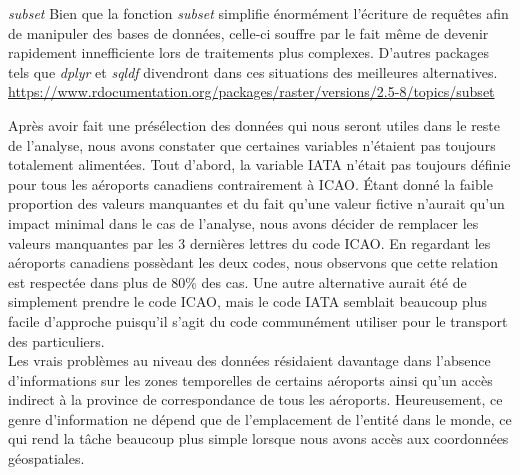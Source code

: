 \begin{moreInfo}{\emph{subset}}
	Bien que la fonction \emph{subset} simplifie énormément l'écriture de requêtes afin de manipuler des bases de données, celle-ci souffre par le fait même de devenir rapidement innefficiente lors de traitements plus complexes. D'autres packages tels que \emph{dplyr} et \emph{sqldf} divendront dans ces situations des meilleures alternatives. \\
	\url{https://www.rdocumentation.org/packages/raster/versions/2.5-8/topics/subset}
\end{moreInfo}

\noindent
Après avoir fait une présélection des données qui nous seront utiles dans le reste de l'analyse, nous avons constater que certaines variables n'étaient pas toujours totalement alimentées. Tout d'abord, la variable IATA n'était pas toujours définie pour tous les aéroports canadiens contrairement à ICAO. Étant donné la faible proportion des valeurs manquantes et du fait qu'une valeur fictive n'aurait qu'un impact minimal dans le cas de l'analyse, nous avons décider de remplacer les valeurs manquantes par les 3 dernières lettres du code ICAO. En regardant les aéroports canadiens possèdant les deux codes, nous observons que cette relation est respectée dans plus de 80\% des cas. Une autre alternative aurait été de simplement prendre le code ICAO, mais le code IATA semblait beaucoup plus facile d'approche puisqu'il s'agit du code communément utiliser pour le transport des particuliers. \\

\noindent
Les vrais problèmes au niveau des données résidaient davantage dans l'absence d'informations sur les zones temporelles de certains aéroports ainsi qu'un accès indirect à la province de correspondance de tous les aéroports. Heureusement, ce genre d'information ne dépend que de l'emplacement de l'entité dans le monde, ce qui rend la tâche beaucoup plus simple lorsque nous avons accès aux coordonnées géospatiales. \\


